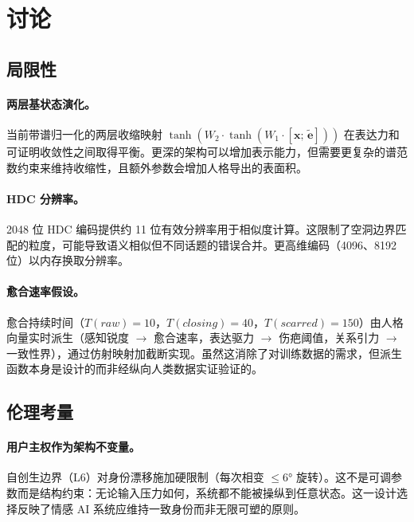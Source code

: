 \documentclass[11pt]{article}
\begin{document}
\section{讨论}
\label{sec:discussion}

\subsection{局限性}

\paragraph{两层基状态演化。}当前带谱归一化的两层收缩映射 $\tanh(W_2 \cdot \tanh(W_1 \cdot [\mathbf{x};\, \tilde{\mathbf{e}}]))$ 在表达力和可证明收敛性之间取得平衡。更深的架构可以增加表示能力，但需要更复杂的谱范数约束来维持收缩性，且额外参数会增加人格导出的表面积。

\paragraph{HDC 分辨率。}2048 位 HDC 编码提供约 11 位有效分辨率用于相似度计算。这限制了空洞边界匹配的粒度，可能导致语义相似但不同话题的错误合并。更高维编码（4096、8192 位）以内存换取分辨率。

\paragraph{愈合速率假设。}愈合持续时间（$T(raw)=10$，$T(closing)=40$，$T(scarred)=150$）由人格向量实时派生（感知锐度 $\to$ 愈合速率，表达驱力 $\to$ 伤疤阈值，关系引力 $\to$ 一致性界），通过仿射映射加截断实现。虽然这消除了对训练数据的需求，但派生函数本身是设计的而非经纵向人类数据实证验证的。

\subsection{伦理考量}

\paragraph{用户主权作为架构不变量。}自创生边界（L6）对身份漂移施加硬限制（每次相变 $\leq 6°$ 旋转）。这不是可调参数而是结构约束：无论输入压力如何，系统都不能被操纵到任意状态。这一设计选择反映了情感 AI 系统应维持一致身份而非无限可塑的原则。
\end{document}
